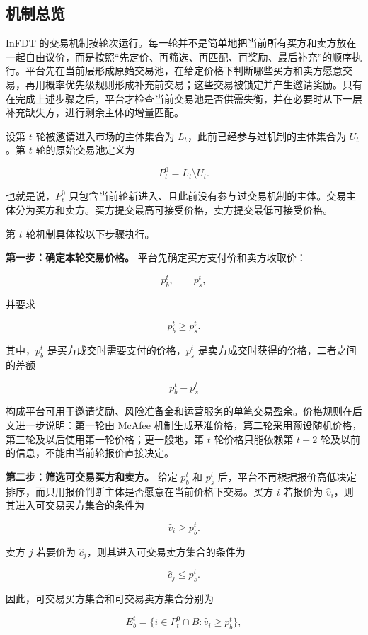 \documentclass[UTF8,11pt]{ctexart}
\begin{document}
\subsection{机制总览}

InFDT 的交易机制按轮次运行。每一轮并不是简单地把当前所有买方和卖方放在一起自由议价，而是按照“先定价、再筛选、再匹配、再奖励、最后补充”的顺序执行。平台先在当前层形成原始交易池，在给定价格下判断哪些买方和卖方愿意交易，再用概率优先级规则形成补充前交易；这些交易被锁定并产生邀请奖励。只有在完成上述步骤之后，平台才检查当前交易池是否供需失衡，并在必要时从下一层补充缺失方，进行剩余主体的增量匹配。

设第 \(t\) 轮被邀请进入市场的主体集合为 \(L_t\)，此前已经参与过机制的主体集合为 \(U_t\)。第 \(t\) 轮的原始交易池定义为

\[
    P_t^0 = L_t \setminus U_t .
\]

也就是说，\(P_t^0\) 只包含当前轮新进入、且此前没有参与过交易机制的主体。交易主体分为买方和卖方。买方提交最高可接受价格，卖方提交最低可接受价格。

第 \(t\) 轮机制具体按以下步骤执行。

\textbf{第一步：确定本轮交易价格。}
平台先确定买方支付价和卖方收取价：

\[
    p_b^t,\qquad p_s^t,
\]

并要求

\[
    p_b^t \ge p_s^t.
\]

其中，\(p_b^t\) 是买方成交时需要支付的价格，\(p_s^t\) 是卖方成交时获得的价格，二者之间的差额

\[
    p_b^t-p_s^t
\]

构成平台可用于邀请奖励、风险准备金和运营服务的单笔交易盈余。价格规则在后文进一步说明：第一轮由 McAfee 机制生成基准价格，第二轮采用预设随机价格，第三轮及以后使用第一轮价格；更一般地，第 \(t\) 轮价格只能依赖第 \(t-2\) 轮及以前的信息，不能由当前轮报价直接决定。

\textbf{第二步：筛选可交易买方和卖方。}
给定 \(p_b^t\) 和 \(p_s^t\) 后，平台不再根据报价高低决定排序，而只用报价判断主体是否愿意在当前价格下交易。买方 \(i\) 若报价为 \(\hat v_i\)，则其进入可交易买方集合的条件为

\[
    \hat v_i \ge p_b^t.
\]

卖方 \(j\) 若要价为 \(\hat c_j\)，则其进入可交易卖方集合的条件为

\[
    \hat c_j \le p_s^t.
\]

因此，可交易买方集合和可交易卖方集合分别为

\[
    E_b^t=\{i\in P_t^0\cap B:\hat v_i\ge p_b^t\},
\]
\end{document}
